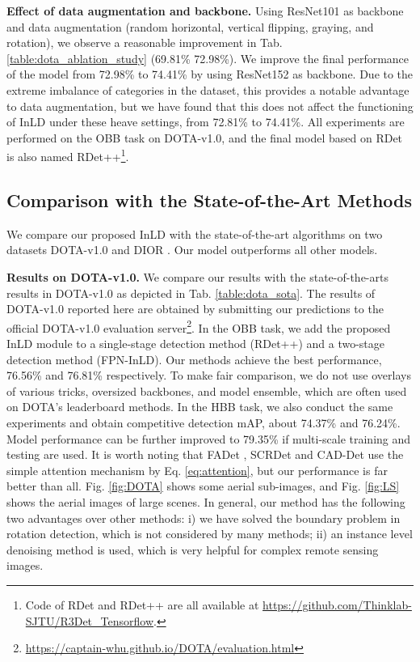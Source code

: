 \documentclass[10pt,journal,compsoc]{IEEEtran}
\begin{document}
\textbf{Effect of data augmentation and backbone.}
Using ResNet101 as backbone and data augmentation (random horizontal, vertical flipping, graying, and rotation), we observe a reasonable improvement in Tab. \ref{table:dota_ablation_study} (69.81\%  72.98\%). We improve the final performance of the model from 72.98\% to 74.41\% by using ResNet152 as backbone. Due to the extreme imbalance of categories in the dataset, this provides a notable advantage to data augmentation, but we have found that this does not affect the functioning of InLD under these heave settings, from 72.81\% to 74.41\%. All experiments are performed on the OBB task on DOTA-v1.0, and the final model based on RDet is also named RDet++\footnote{Code of RDet and RDet++ are all available at \url{https://github.com/Thinklab-SJTU/R3Det_Tensorflow}.}.


\subsection{Comparison with the State-of-the-Art Methods}\label{subsec:sota}
We compare our proposed InLD with the state-of-the-art algorithms on two datasets DOTA-v1.0 \cite{xia2018dota} and DIOR \cite{li2020object}. Our model outperforms all other models.

\textbf{Results on DOTA-v1.0.}
We compare our results with the state-of-the-arts results in DOTA-v1.0 as depicted in Tab. \ref{table:dota_sota}. The results of DOTA-v1.0 reported here are obtained by submitting our predictions to the official DOTA-v1.0 evaluation server\footnote{\url{https://captain-whu.github.io/DOTA/evaluation.html}}. In the OBB task, we add the proposed InLD module to a single-stage detection method (RDet++) and a two-stage detection method (FPN-InLD). Our methods achieve the best performance, 76.56\% and 76.81\% respectively. To make fair comparison, we do not use overlays of various tricks, oversized backbones, and model ensemble, which are often used on DOTA's leaderboard methods. In the HBB task, we also conduct the same experiments and obtain competitive detection mAP, about 74.37\% and 76.24\%. Model performance can be further improved to 79.35\% if multi-scale training and testing are used. It is worth noting that FADet \cite{li2019feature}, SCRDet \cite{yang2019scrdet} and CAD-Det \cite{zhang2019cad} use the simple attention mechanism by Eq. \ref{eq:attention}, but our performance is far better than all. Fig. \ref{fig:DOTA} shows some aerial sub-images, and Fig. \ref{fig:LS} shows the aerial images of large scenes. In general, our method has the following two advantages over other methods:
i) we have solved the boundary problem in rotation detection, which is not considered by many methods; ii) an instance level denoising method is used, which is very helpful for complex remote sensing images.
\end{document}
